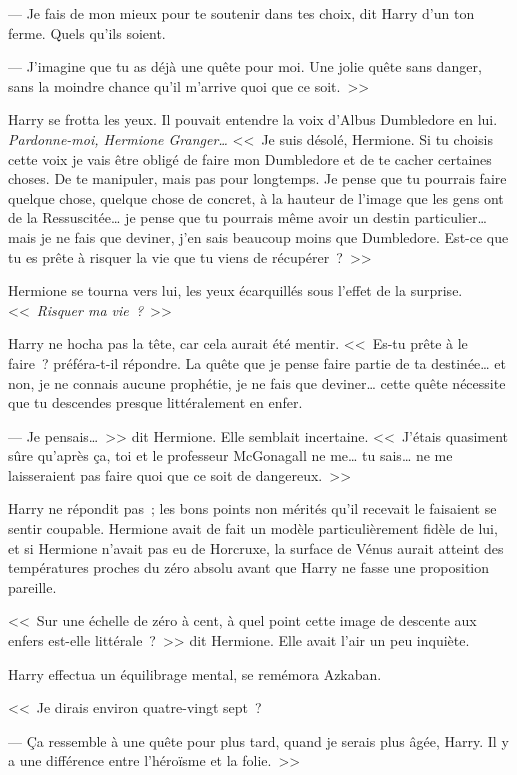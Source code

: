 --- Je fais de mon mieux pour te soutenir dans tes choix, dit Harry d'un ton ferme. Quels qu'ils soient.

--- J'imagine que tu as déjà une quête pour moi. Une jolie quête sans danger, sans la moindre chance qu'il m'arrive quoi que ce soit.~>>

Harry se frotta les yeux. Il pouvait entendre la voix d'Albus Dumbledore en lui. \emph{Pardonne-moi, Hermione Granger…} <<~Je suis désolé, Hermione. Si tu choisis cette voix je vais être obligé de faire mon Dumbledore et de te cacher certaines choses. De te manipuler, mais pas pour longtemps. Je pense que tu pourrais faire quelque chose, quelque chose de concret, à la hauteur de l'image que les gens ont de la Ressuscitée… je pense que tu pourrais même avoir un destin particulier… mais je ne fais que deviner, j'en sais beaucoup moins que Dumbledore. Est-ce que tu es prête à risquer la vie que tu viens de récupérer~?~>>

Hermione se tourna vers lui, les yeux écarquillés sous l'effet de la surprise. <<~\emph{Risquer ma vie~?}~>>

Harry ne hocha pas la tête, car cela aurait été mentir. <<~Es-tu prête à le faire~? préféra-t-il répondre. La quête que je pense faire partie de ta destinée… et non, je ne connais aucune prophétie, je ne fais que deviner… cette quête nécessite que tu descendes presque littéralement en enfer.

--- Je pensais…~>> dit Hermione. Elle semblait incertaine. <<~J'étais quasiment sûre qu'après ça, toi et le professeur McGonagall ne me… tu sais… ne me laisseraient pas faire quoi que ce soit de dangereux.~>>

Harry ne répondit pas~; les bons points non mérités qu'il recevait le faisaient se sentir coupable. Hermione avait de fait un modèle particulièrement fidèle de lui, et si Hermione n'avait pas eu de Horcruxe, la surface de Vénus aurait atteint des températures proches du zéro absolu avant que Harry ne fasse une proposition pareille.

<<~Sur une échelle de zéro à cent, à quel point cette image de descente aux enfers est-elle littérale~?~>> dit Hermione. Elle avait l'air un peu inquiète.

Harry effectua un équilibrage mental, se remémora Azkaban.

<<~Je dirais environ quatre-vingt sept~?

--- Ça ressemble à une quête pour plus tard, quand je serais plus âgée, Harry. Il y a une différence entre l'héroïsme et la folie.~>>

